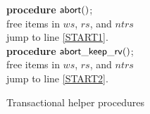 \documentclass[11pt]{article}
\begin{document}
\begin{figure}[htb]
{{\begin{minipage}[t]{150mm}
\begin{tabbing}
{\bf procedure} ${\sf abort}()$; \\
 \> free items in $ws$, $rs$, and $ntrs$ \\
 \> jump to line \ref{START1}. \\

{\bf procedure} ${\sf abort\_keep\_rv}()$; \\
 \> free items in $ws$, $rs$, and $ntrs$ \\
 \> jump to line \ref{START2}. \\



\end{tabbing}
\normalsize
\end{minipage}
}
\caption{Transactional helper procedures}
\label{fig-prevent-looping}
}
\end{figure}
\end{document}
